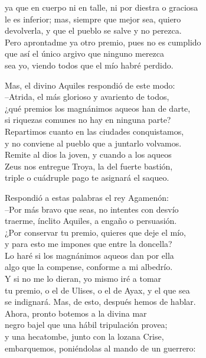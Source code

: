\documentclass[11pt,twoside]{article}
\begin{document}
ya que en cuerpo ni en talle, ni por diestra o graciosa\\
le es inferior; mas, siempre que mejor sea, quiero\\
devolverla, y que el pueblo se salve y no perezca.\\
Pero aprontadme ya otro premio, pues no es cumplido\\
que así el único argivo que ninguno merezca\\
sea yo, viendo todos que el mío habré perdido.\par
Mas, el divino Aquiles respondió de este modo:\\
--Atrida, el más glorioso y avariento de todos,\\
¿qué premios los magnánimos aqueos han de darte,\\
si riquezas comunes no hay en ninguna parte?\\
Repartimos cuanto en las ciudades conquistamos,\\
y no conviene al pueblo que a juntarlo volvamos.\\
Remite al dios la joven, y cuando a los aqueos\\
Zeus nos entregue Troya, la del fuerte bastión,\\
triple o cuádruple pago te asignará el saqueo.\par
Respondió a estas palabras el rey Agamenón:\\
--Por más bravo que seas, no intentes con desvío\\
traerme, ínclito Aquiles, a engaño o persuasión.\\
¿Por conservar tu premio, quieres que deje el mío,\\
y para esto me impones que entre la doncella?\\
Lo haré si los magnánimos aqueos dan por ella\\
algo que la compense, conforme a mi albedrío.\\
Y si no me lo dieran, yo mismo iré a tomar\\
tu premio, o el de Ulises, o el de Ayax, y el que sea\\
se indignará. Mas, de esto, después hemos de hablar.\\
Ahora, pronto botemos a la divina mar\\
negro bajel que una hábil tripulación provea;\\
y una hecatombe, junto con la lozana Crise,\\
embarquemos, poniéndolas al mando de un guerrero:\\
\end{document}
